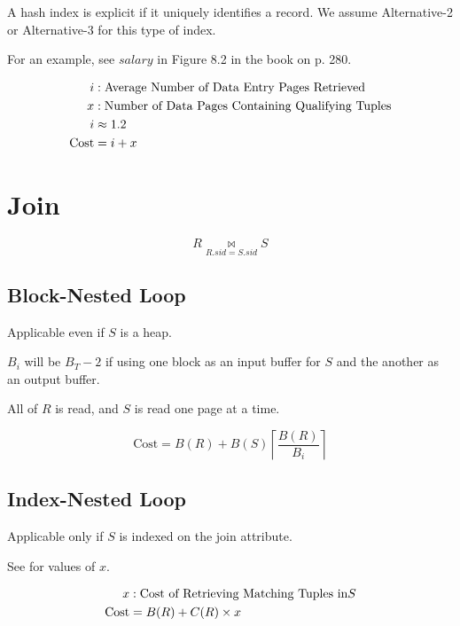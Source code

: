 \documentclass{article}
\newcommand{\ceil}[1]{\left\lceil#1\right\rceil}
\begin{document}
A hash index is explicit if it uniquely identifies a record. We assume
Alternative-2 or Alternative-3 for this type of index.

For an example, see \(salary\) in Figure 8.2 in the book on p. 280.

\begin{align}
  i &: \text{Average Number of Data Entry Pages Retrieved} \notag \\
  x &: \text{Number of Data Pages Containing Qualifying Tuples} \notag \\
  i &\approx 1.2 \\
  \text{Cost} &= i + x
\end{align}

\section{Join}

\begin{equation*}
  R \Join\limits_{R.\mathit{sid} = S.\mathit{sid}} S
\end{equation*}

\subsection{Block-Nested Loop}

Applicable even if \(S\) is a heap.

\(B_i\) will be \(B_T - 2\) if using one block as an input buffer for
\(S\) and the another as an output buffer.

All of \(R\) is read, and \(S\) is read one page at a time.

\begin{equation}
  \text{Cost} = B(R) + B(S)\ceil{\frac{B(R)}{B_i}}
\end{equation}

\subsection{Index-Nested Loop}

Applicable only if \(S\) is indexed on the join attribute.

See  for values of \(x\).

\begin{align}
  x &: \text{Cost of Retrieving Matching Tuples in} S \notag \\
  \text{Cost} &= B(R) + C(R) \times x
\end{align}
\end{document}

